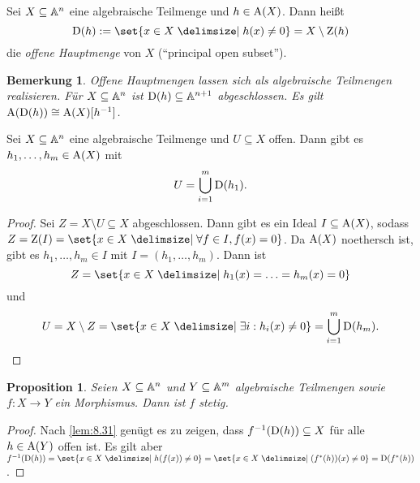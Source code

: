 \documentclass[12pt,a4paper]{scrartcl}
\theoremstyle{cplain}
\newtheorem{prop}[thmcounter]{Proposition}
\theoremstyle{cdef}
\newtheorem{beme}[thmcounter]{Bemerkung}
\begin{document}
\begin{defi}
	Sei $X\subseteq \mathbb A^n$ eine algebraische Teilmenge und $h\in \operatorname{A}(X)$. Dann heißt \[\D(h) := \set{x\in X\given h(x) \neq 0} = X\setminus \Z(h)\] die \emph{offene Hauptmenge} von $X$ (\enquote{principal open subset}).
\end{defi}
\begin{beme}
	Offene Hauptmengen lassen sich als algebraische Teilmengen realisieren. Für $X\subseteq \mathbb A^n$ ist $\operatorname{D}(h)\subseteq \mathbb A^{n+1}$ abgeschlossen. Es gilt $\operatorname{A}(\operatorname{D}(h))\cong \operatorname{A}(X)[h^{-1}]$. 
\end{beme}
\begin{lem} \label{lem:8.31}
	Sei $X\subseteq \mathbb A^n$ eine algebraische Teilmenge und $U\subseteq X$ offen. Dann gibt es $h_1,\dots, h_m\in \operatorname{A}(X)$ mit \[U = \bigcup_{i = 1}^m \operatorname{D}(h_1).\]
\end{lem}
\begin{proof}
	Sei $Z = X\setminus U\subseteq X$ abgeschlossen. Dann gibt es ein Ideal $I\subseteq \operatorname{A}(X)$, sodass $Z = \Z(I) = \set{x\in X\given \forall f\in I, f(x) = 0}$. Da $\operatorname{A}(X)$ noethersch ist, gibt es $h_1,\dots, h_m\in I$ mit $I = (h_1,\dots, h_m)$. Dann ist
	\[Z  = \set{x\in X\given h_1(x) = \ldots = h_m(x)= 0}\]
	und
	\[U = X\setminus Z = \set{x\in X\given \exists i: h_i(x) \neq 0} = \bigcup_{i = 1}^m \D(h_m).\qedhere\]
\end{proof}
\begin{prop}
	Seien $X\subseteq\mathbb A^n$ und $Y\subseteq \mathbb A^m$ algebraische Teilmengen sowie $f\colon X\to Y$ ein Morphismus. Dann ist $f$ stetig.
\end{prop}
\begin{proof}
	Nach \cref{lem:8.31} genügt es zu zeigen, dass $f^{-1}(\operatorname{D}(h))\subseteq X$ für alle $h\in \operatorname{A}(Y)$ offen ist. Es gilt aber $f^{-1}(\D(h)) = \set{x\in X\given h(f(x))\neq 0} = \set{x\in X\given (f^*(h))(x)\neq 0} = \D(f^*(h))$.
\end{proof}
\end{document}
